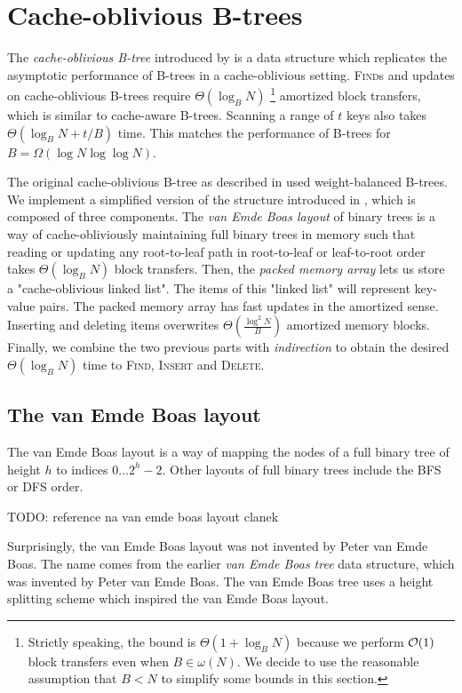 \chapter{Cache-oblivious B-trees}
The \textit{cache-oblivious B-tree} introduced by \cite{cobt}
is a data structure which replicates the asymptotic performance of B-trees
in a cache-oblivious setting.
\textsc{Find}s and updates on cache-oblivious B-trees require $\Theta(\log_B N)$
\footnote{Strictly speaking, the bound is $\Theta(1+\log_B N)$
	because we perform $\mathcal{O}(1)$ block transfers even when $B\in\omega(N)$.
	We decide to use the reasonable assumption that
	$B<N$ to simplify some bounds in this section.}
amortized block transfers, which is similar to cache-aware B-trees.
Scanning a range of $t$ keys also takes $\Theta(\log_B N+t/B)$ time.
This matches the performance of B-trees for $B=\Omega(\log N\log\log N)$.

The original cache-oblivious B-tree as described in \cite{cobt} used
weight-balanced B-trees. We implement a simplified version of the structure
introduced in \cite{brodal01}, which is composed of three components.
The \textit{van Emde Boas layout} of binary trees is a way of cache-obliviously
maintaining full binary trees in memory such that reading or updating any
root-to-leaf path in root-to-leaf or leaf-to-root order takes $\Theta(\log_B N)$
block transfers.
Then, the \textit{packed memory array} lets us store a "cache-oblivious linked
list". The items of this "linked list" will represent key-value pairs.
The packed memory array has fast updates in the amortized sense. Inserting
and deleting items overwrites $\Theta(\frac{\log^2 N}{B})$ amortized memory
blocks.
Finally, we combine the two previous parts with \textit{indirection} to obtain
the desired $\Theta(\log_B N)$ time to \textsc{Find}, \textsc{Insert} and
\textsc{Delete}.

\section{The van Emde Boas layout}
The van Emde Boas layout is a way of mapping the nodes of a full binary
tree of height $h$ to indices $0\ldots 2^h-2$. Other layouts of full binary
trees include the BFS or DFS order.

TODO: reference na van emde boas layout clanek

Surprisingly, the van Emde Boas layout was not invented by Peter van Emde Boas.
The name comes from the earlier \textit{van Emde Boas tree} data structure,
which was invented by Peter van Emde Boas. %
The van Emde Boas tree uses a height splitting scheme which inspired
the van Emde Boas layout.

